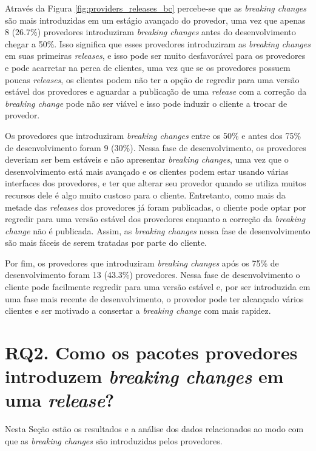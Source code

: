 Através da Figura \ref{fig:providers_releases_bc} percebe-se que as \textit{breaking changes} são mais introduzidas em um estágio avançado do provedor, uma vez que apenas 8 (26.7\%) provedores introduziram \textit{breaking changes} antes do desenvolvimento chegar a 50\%.  Isso significa que esses provedores introduziram as \textit{breaking changes} em suas primeiras \textit{releases}, e isso pode ser muito desfavorável para os provedores e pode acarretar na perca de clientes, uma vez que se os provedores possuem poucas \textit{releases}, os clientes podem não ter a opção de regredir para uma versão estável dos provedores e aguardar a publicação de uma \textit{release} com a correção da \textit{breaking change} pode não ser viável e isso pode induzir o cliente a trocar de provedor.

Os provedores que introduziram \textit{breaking changes} entre os 50\% e antes dos 75\% de desenvolvimento foram 9 (30\%). Nessa fase de desenvolvimento, os provedores deveriam ser bem estáveis e não apresentar \textit{breaking changes}, uma vez que o desenvolvimento está mais avançado e os clientes podem estar usando várias interfaces dos provedores, e ter que alterar seu provedor quando se utiliza muitos recursos dele é algo muito custoso para o cliente. Entretanto, como mais da metade das \textit{releases} dos provedores já foram publicadas, o cliente pode optar por regredir para uma versão estável dos provedores enquanto a correção da \textit{breaking change} não é publicada. Assim, as \textit{breaking changes} nessa fase de desenvolvimento são mais fáceis de serem tratadas por parte do cliente.

Por fim, os provedores que introduziram \textit{breaking changes} após os 75\% de desenvolvimento foram 13 (43.3\%) provedores. Nessa fase de desenvolvimento o cliente pode facilmente regredir para uma versão estável e, por ser introduzida em uma fase mais recente de desenvolvimento, o provedor pode ter alcançado vários clientes e ser motivado a consertar a \textit{breaking change} com mais rapidez.

\section{RQ2. Como os pacotes provedores introduzem \textit{breaking changes} em uma \textit{release}?}
\label{sec:qp2:results}
Nesta Seção estão os resultados e a análise dos dados relacionados ao modo com que as \textit{breaking changes} são introduzidas pelos provedores.

